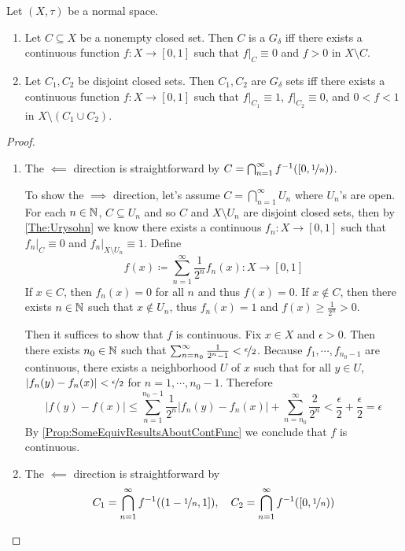 \documentclass[screen,single]{techreport}
\numberwithin{equation}{section}
\begin{document}
\begin{proposition}\label{Prop:GdeltaStrongerSeparation}
	Let $(X,\tau)$ be a normal space.
	\begin{enumerate}
		\item Let $C \subseteq X$ be a nonempty closed set.
		Then $C$ is a $G_\delta$ iff there exists a continuous function $f : X \to [0,1]$ such that $f|_C \equiv 0$ and $f > 0$ in $X \setminus C$.
		\item Let $C_1,C_2$ be disjoint closed sets.
		Then $C_1,C_2$ are $G_\delta$ sets iff there exists a continuous function $f: X \to [0,1]$ such that $f|_{C_1} \equiv 1$, $f|_{C_2} \equiv 0$, and $0 < f < 1$ in $X \setminus (C_1 \cup C_2)$.
	\end{enumerate}
\end{proposition}
\begin{proof}\
	\begin{enumerate}
		\item  The $\impliedby$ direction is straightforward by $C = \bigcap_{n=1}^\infty f^{-1}([0,\nicefrac{1}{n}))$.
		
		To show the $\implies$ direction, let's assume $C = \bigcap_{n=1}^\infty U_n$ where $U_n$'s are open.
		For each $n \in \mathbb{N}$, $C \subseteq U_n$ and so $C$ and $X \setminus U_n$ are disjoint closed sets, then by \cref{The:Urysohn} we know there exists a continuous $f_n : X \to [0,1]$ such that $f_n|_C \equiv 0$ and $f_n|_{X \setminus U_n} \equiv 1$.
		Define
		\[
		f(x) \coloneqq \sum_{n=1}^\infty \frac{1}{2^n} f_n(x) : X \to [0,1]
		\]
		If $x \in C$, then $f_n(x) = 0$ for all $n$ and thus $f(x) = 0$.
		If $x \not\in C$, then there exists $n \in \mathbb{N}$ such that $x \not\in U_n$, thus $f_n(x) = 1$ and $f(x) \ge \frac{1}{2^n} > 0$.
		
		Then it suffices to show that $f$ is continuous.
		Fix $x \in X$ and $\epsilon > 0$.
		Then there exists $n_0 \in \mathbb{N}$ such that $\sum_{n=n_0}^\infty \frac{1}{2^n-1} < \nicefrac{\epsilon}{2}$.
		Because $f_1,\cdots,f_{n_0-1}$ are continuous, there exists a neighborhood $U$ of $x$ such that for all $y \in U$, $|f_n(y) - f_n(x)| < \nicefrac{\epsilon}{2}$ for $n=1,\cdots,n_0-1$.
		Therefore
		\[
			|f(y) - f(x)|  \le \sum_{n=1}^{n_0-1} \frac{1}{2^n} |f_n(y) - f_n(x)| + \sum_{n=n_0}^\infty \frac{2}{2^n} < \frac{\epsilon}{2} + \frac{\epsilon}{2} = \epsilon
		\]
		By \cref{Prop:SomeEquivResultsAboutContFunc} we conclude that $f$ is continuous.
		
		\item The $\impliedby$ direction is straightforward by
		\[
		C_1 = \bigcap_{n=1}^\infty f^{-1}((1-\nicefrac{1}{n},1]), \quad C_2 = \bigcap_{n=1}^\infty f^{-1}([0,\nicefrac{1}{n}))
		\]
		

\end{enumerate}
\end{proof}
\end{document}
